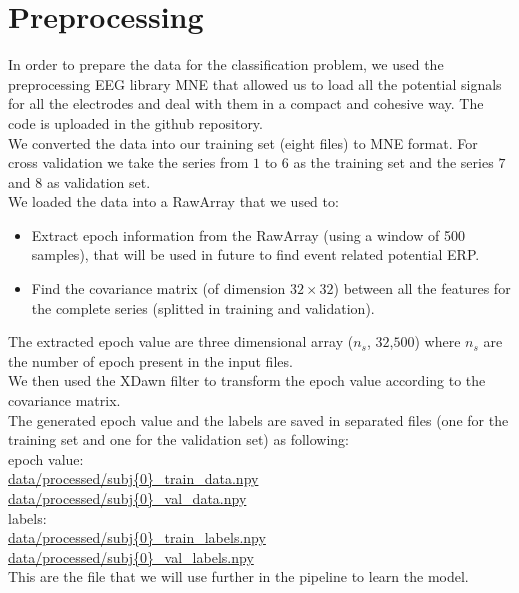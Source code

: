 \documentclass[]{article}
\begin{document}
\section{Preprocessing}
In order to prepare the data for the classification problem, we used the preprocessing EEG library MNE\cite{MNE} that allowed us to load all the potential signals for all the electrodes and deal with them in a compact and cohesive way. The code is uploaded in the github repository\cite{Preprocessing}.\\
 We converted the data into our training set (eight files) to MNE format. For cross validation we take the series from $1$ to $6$ as the training set and the series $7$ and $8$ as validation set.\\  
We loaded the data into a RawArray\cite{MNE} that we used to:
\begin{itemize}
\item Extract epoch information from the RawArray (using a window of 500 samples), that will be used in future to find event related potential ERP.  
\item Find the covariance matrix (of dimension $32\times32$) between all the features for the complete series (splitted in training and validation). 
\end{itemize}
The extracted epoch value are  three dimensional array ($n_s$, $32$,$500$) where $n_s$ are the number of epoch present in the input files. \\
We then used the XDawn filter\cite{MNE} to transform the epoch value according to the covariance matrix.\\
The generated epoch value and the labels are saved in separated files (one for the training set and one for the validation set) as following:\\
epoch value:\\
\url{data/processed/subj{0}_train_data.npy }\\
\url{data/processed/subj{0}_val_data.npy}\\
labels: \\
\url{data/processed/subj{0}_train_labels.npy}\\
\url{data/processed/subj{0}_val_labels.npy}\\
This are the file that we will use further in the pipeline to learn the model.
\end{document}
